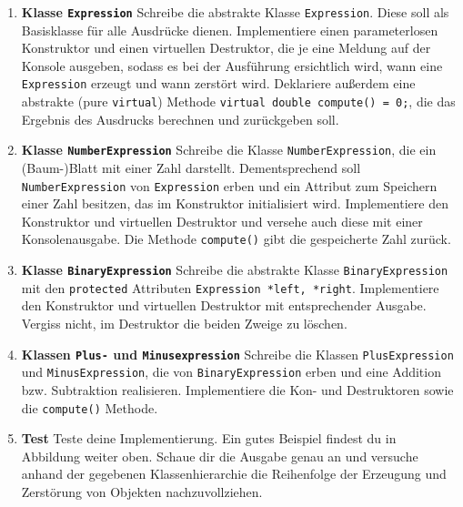 \begin{enumerate}

\item \textbf{Klasse \texttt{Expression}}
Schreibe die abstrakte Klasse \texttt{Expression}.
Diese soll als Basisklasse für alle Ausdrücke dienen.
Implementiere einen parameterlosen Konstruktor und einen virtuellen Destruktor, die je eine Meldung auf der Konsole ausgeben, sodass es bei der Ausführung ersichtlich wird, wann eine \texttt{Expression} erzeugt und wann zerstört wird.
Deklariere außerdem eine abstrakte (pure \texttt{virtual}) Methode \texttt{virtual double compute() = 0;}, die das Ergebnis des Ausdrucks berechnen und zurückgeben soll. 

\item \textbf{Klasse \texttt{NumberExpression}}
Schreibe die Klasse \texttt{NumberExpression}, die ein (Baum-)Blatt mit einer Zahl darstellt.
Dementsprechend soll \texttt{NumberExpression} von \texttt{Expression} erben und ein Attribut zum Speichern einer Zahl besitzen, das im Konstruktor initialisiert wird.
Implementiere den Konstruktor und virtuellen Destruktor und versehe auch diese mit einer Konsolenausgabe.
Die Methode \texttt{compute()} gibt die gespeicherte Zahl zurück.

\item \textbf{Klasse \texttt{BinaryExpression}}
Schreibe die abstrakte Klasse \texttt{BinaryExpression} mit den \texttt{protected} Attributen \texttt{Expression *left, *right}.
Implementiere den Konstruktor und virtuellen Destruktor mit entsprechender Ausgabe.
Vergiss nicht, im Destruktor die beiden Zweige zu löschen. 

\item \textbf{Klassen \texttt{Plus-} und \texttt{Minusexpression}}
Schreibe die Klassen \texttt{PlusExpression} und \texttt{MinusExpression}, die von \texttt{BinaryExpression} erben und eine Addition bzw. Subtraktion realisieren. 
Implementiere die Kon- und Destruktoren sowie die \texttt{compute()} Methode.

\item \textbf{Test}
Teste deine Implementierung.
Ein gutes Beispiel findest du in Abbildung weiter oben.
Schaue dir die Ausgabe genau an und versuche anhand der gegebenen Klassenhierarchie die Reihenfolge der Erzeugung und Zerstörung von Objekten  nachzuvollziehen.

\end{enumerate}



\newpage

